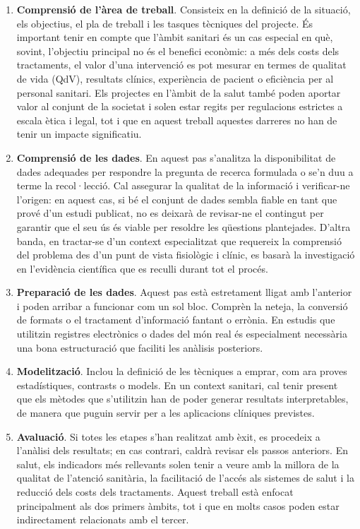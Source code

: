 \documentclass[CAT]{TFUOC}%
\begin{document}
\begin{enumerate}
\def\labelenumi{\arabic{enumi}.}
\item
  \textbf{Comprensió de l'àrea de treball}. Consisteix en la definició de la situació, els objectius, el pla de treball i les tasques tècniques del projecte. És important tenir en compte que l'àmbit sanitari és un cas especial en què, sovint, l'objectiu principal no és el benefici econòmic: a més dels costs dels tractaments, el valor d'una intervenció es pot mesurar en termes de qualitat de vida (QdV), resultats clínics, experiència de pacient o eficiència per al personal sanitari. Els projectes en l'àmbit de la salut també poden aportar valor al conjunt de la societat i solen estar regits per regulacions estrictes a escala ètica i legal, tot i que en aquest treball aquestes darreres no han de tenir un impacte significatiu.
\item
  \textbf{Comprensió de les dades}. En aquest pas s'analitza la disponibilitat de dades adequades per respondre la pregunta de recerca formulada o se'n duu a terme la recol·lecció. Cal assegurar la qualitat de la informació i verificar-ne l'origen: en aquest cas, si bé el conjunt de dades sembla fiable en tant que prové d'un estudi publicat, no es deixarà de revisar-ne el contingut per garantir que el seu ús és viable per resoldre les qüestions plantejades. D'altra banda, en tractar-se d'un context especialitzat que requereix la comprensió del problema des d'un punt de vista fisiològic i clínic, es basarà la investigació en l'evidència científica que es reculli durant tot el procés.
\item
  \textbf{Preparació de les dades}. Aquest pas està estretament lligat amb l'anterior i poden arribar a funcionar com un sol bloc. Comprèn la neteja, la conversió de formats o el tractament d'informació fantant o errònia. En estudis que utilitzin registres electrònics o dades del món real és especialment necessària una bona estructuració que faciliti les anàlisis posteriors.
\item
  \textbf{Modelització}. Inclou la definició de les tècniques a emprar, com ara proves estadístiques, contrasts o models. En un context sanitari, cal tenir present que els mètodes que s'utilitzin han de poder generar resultats interpretables, de manera que puguin servir per a les aplicacions clíniques previstes.
\item
  \textbf{Avaluació}. Si totes les etapes s'han realitzat amb èxit, es procedeix a l'anàlisi dels resultats; en cas contrari, caldrà revisar els passos anteriors. En salut, els indicadors més rellevants solen tenir a veure amb la millora de la qualitat de l'atenció sanitària, la facilitació de l'accés als sistemes de salut i la reducció dels costs dels tractaments. Aquest treball està enfocat principalment als dos primers àmbits, tot i que en molts casos poden estar indirectament relacionats amb el tercer.

\end{enumerate}
\end{document}
